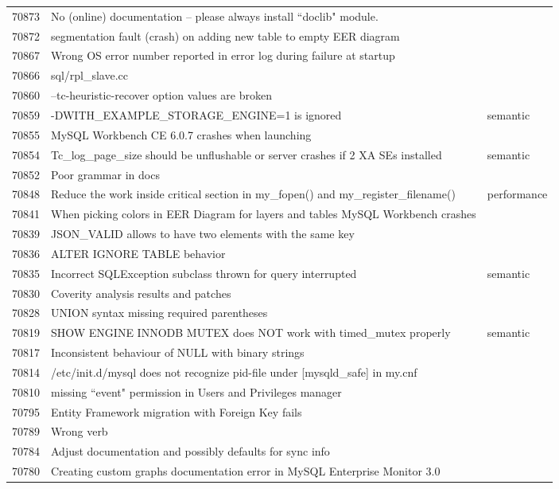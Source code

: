 \begin{longtable}[c]{p{1cm}p{8cm}p{3cm}}
70873 & No (online) documentation -- please always install ``doclib" module. &  \\
70872 & segmentation fault (crash) on adding new table to empty EER diagram &  \\
70867 & Wrong OS error number reported in error log during failure at startup &  \\
70866 & sql/rpl\_slave.cc &  \\
70860 & --tc-heuristic-recover option values are broken &  \\
70859 & -DWITH\_EXAMPLE\_STORAGE\_ENGINE=1 is ignored & semantic \\
70855 & MySQL Workbench CE 6.0.7 crashes when launching &  \\
70854 & Tc\_log\_page\_size should be unflushable or server crashes if 2 XA SEs installed & semantic \\
70852 & Poor grammar in docs &  \\
70848 & Reduce the work inside critical section in my\_fopen() and my\_register\_filename() & performance \\
70841 & When picking colors in EER Diagram for layers and tables MySQL Workbench crashes &  \\
70839 & JSON\_VALID allows to have two elements with the same key &  \\
70836 & ALTER IGNORE TABLE behavior &  \\
70835 & Incorrect SQLException subclass thrown for query interrupted & semantic \\
70830 & Coverity analysis results and patches &  \\
70828 & UNION syntax missing required parentheses &  \\
70819 & SHOW ENGINE INNODB MUTEX does NOT work with timed\_mutex properly & semantic \\
70817 & Inconsistent behaviour of NULL with binary strings &  \\
70814 & /etc/init.d/mysql does not recognize pid-file under {[}mysqld\_safe{]} in my.cnf &  \\
70810 & missing ``event" permission in Users and Privileges manager &  \\
70795 & Entity Framework migration with Foreign Key fails &  \\
70789 & Wrong verb &  \\
70784 & Adjust documentation and possibly defaults for sync info &  \\
70780 & Creating custom graphs documentation error in MySQL Enterprise Monitor 3.0 &  \\

\end{longtable}
